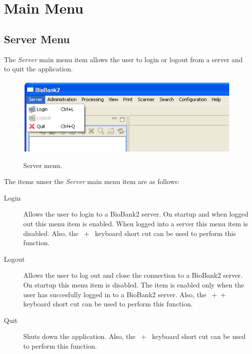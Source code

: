 \section{Main Menu}
\label{sec:main_menu}

\subsection{Server Menu}
The \emph{Server} main menu item allows the user to login or logout from a
server and to quit the application.
    \begin{figure}[H]
      \centering
      \scalebox{0.5}
      { \includegraphics*{screenshots/overview/main_menu_server} }
      \caption{Server menu.}
      \label{fig:main_menu_server}
    \end{figure}
The items unser the \emph{Server} main menu item are as follows:
\begin{description}
  \item[Login] Allows the user to login to a BioBank2 server. On startup and
    when logged out this menu item is enabled. When logged into a server this
    menu item is disabled. Also, the \mbox{ + } keyboard
    short cut can be used to perform this function.
  \item[Logout] Allows the user to log out and close the connection to a
    BioBank2 server. On startup this menu item is disabled. The item is enabled
    only when the user has succesfully logged in to a BioBank2 server. Also,
    the \mbox{ +  + } keyboard short cut can be
    used to perform this function.
  \item[Quit] Shuts down the application. Also, the \mbox{ +
    } keyboard short cut can be used to perform this function.
\end{description}

